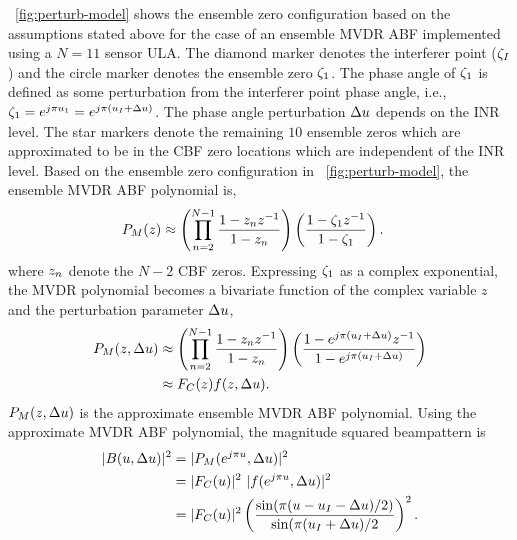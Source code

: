 \figurename{}~\ref{fig:perturb-model} shows the ensemble zero
configuration based on the assumptions stated above for the case of an
ensemble MVDR ABF implemented using a $N = 11$ sensor ULA. The diamond
marker denotes the interferer point ($\zeta_I$) and the circle marker
denotes the ensemble zero $\zeta_1$. The phase angle of $\zeta_1$ is
defined as some perturbation from the interferer point phase angle,
i.e., $\zeta_1 = e^{j\pi u_1} =e^{j\pi(u_I + \Delta u)}$. The
phase angle perturbation $\Delta u$ depends on the INR level. The star
markers denote the remaining $10$ ensemble zeros which are
approximated to be in the CBF zero locations which are independent of
the INR level. Based on the ensemble zero configuration in
\figurename{}~\ref{fig:perturb-model}, the ensemble MVDR ABF
polynomial is,
\begin{align*} 
  {P}_M(z) &\approx \left(\prod\limits_{n=2}^{N-1}\frac{1 - z_n z^{-1}}{1 - z_n}\right) \left(\frac{1 - \zeta_1 z^{-1}}{1 - \zeta_1}\right).
\end{align*}
where $z_n$ denote the $N-2$ CBF zeros. Expressing $\zeta_1$ as a
complex exponential, the MVDR polynomial becomes a bivariate function
of the complex variable $z$ and the perturbation parameter $\Delta u$,
\begin{align}
  \label{eq:mvdr-approx-poly}
  {P}_M(z, \Delta u)  &\approx \left(\prod\limits_{n=2}^{N-1}\frac{1 - z_n z^{-1}}{1 - z_n}\right) \left(\frac{1 - e^{j\pi(u_I + \Delta u)}z^{-1}}{1 - e^{j\pi(u_I + \Delta u)}}\right) \nonumber \\
                         &\approx F_C(z)f(z, \Delta u).
\end{align}
$ {P}_M(z, \Delta u)$ is the approximate ensemble MVDR ABF
polynomial.  Using the approximate MVDR ABF polynomial, the magnitude
squared beampattern is
\begin{align} 
  \label{eq:bp-poly-perturb}
  |B(u, \Delta u)|^2  &= |{P}_M(e^{j\pi u}, \Delta u)|^2 \nonumber\\
  &= |F_C(u)|^2 \
  |f(e^{j\pi u}, \Delta u) |^2 \nonumber\\
  &= |F_C(u)|^2 \left( \frac{\sin(\pi(u - u_I -
      \Delta u)/2)}{\sin(\pi(u_I + \Delta u)/2} \right)^2.
\end{align}

